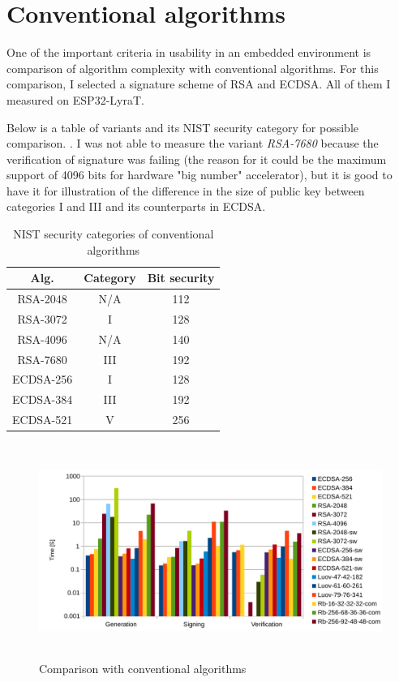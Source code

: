 \documentclass[thesis=M,english]{FITthesis}[2019/12/23]
\begin{document}
\section{Conventional algorithms}
One of the important criteria in usability in an embedded environment is comparison of algorithm complexity with conventional algorithms. For this comparison, I selected a signature scheme of RSA and ECDSA. All of them I measured on ESP32-LyraT.

\bigskip
\noindent
Below is a table of variants and its NIST security category for possible comparison. \cite{L-NIST-RECOMM}. I was not able to measure the variant \textit{RSA-7680} because the verification of signature was failing (the reason for it could be the maximum support of 4096 bits for hardware "big number" accelerator), but it is good to have it for illustration of the difference in the size of public key between categories I and III and its counterparts in ECDSA.
\begin{table}[H]
\centering
\begin{tabular}{|c|c|c|}
\hline
Alg. & Category & Bit security \\ \hline
RSA-2048 & N/A & 112 \\ \hline
RSA-3072 & I & 128 \\ \hline
RSA-4096 & N/A & 140 \\ \hline
RSA-7680 & III & 192 \\ \hline
ECDSA-256 & I & 128 \\ \hline
ECDSA-384 & III & 192 \\ \hline
ECDSA-521 & V & 256 \\ \hline
\end{tabular}
\caption{NIST security categories of conventional algorithms}
\end{table}

\begin{figure}[H]
\centering
\includegraphics[width=13cm,height=7cm]{images/time-all.pdf}
\caption{Comparison with conventional algorithms}
\label{time-all}
\end{figure}
\end{document}
